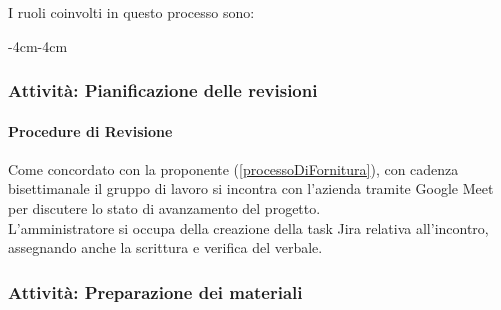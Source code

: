 \documentclass[a4paper,12pt]{article}
\begin{document}
I ruoli coinvolti in questo processo sono:
\begin{table}[H]
    \begin{adjustwidth}{-4cm}{-4cm}
        \centering
    \end{adjustwidth}
\end{table}

\subsubsection{Attività: Pianificazione delle revisioni}\label{pianificazione_revisioni}

\paragraph{Procedure di Revisione}
Come concordato con la proponente (\ref{processoDiFornitura}), con cadenza bisettimanale il gruppo di lavoro si incontra con l'azienda tramite Google Meet per discutere lo stato di avanzamento 
del progetto.\\
L'amministratore si occupa della creazione della task Jira relativa all'incontro, assegnando anche la scrittura e verifica del verbale.

\subsubsection{Attività: Preparazione dei materiali}\label{preparazione_materiali}
\end{document}
